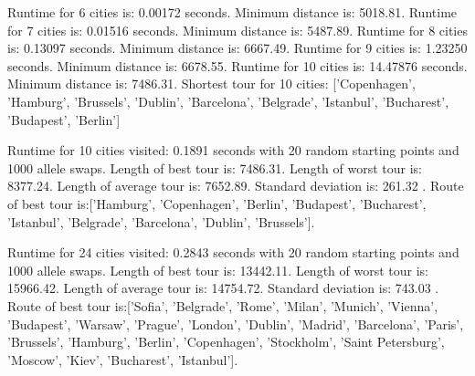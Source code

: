 Runtime for 6 cities is: 0.00172 seconds.
Minimum distance is: 5018.81.
Runtime for 7 cities is: 0.01516 seconds.
Minimum distance is: 5487.89.
Runtime for 8 cities is: 0.13097 seconds.
Minimum distance is: 6667.49.
Runtime for 9 cities is: 1.23250 seconds.
Minimum distance is: 6678.55.
Runtime for 10 cities is: 14.47876 seconds.
Minimum distance is: 7486.31.
Shortest tour for 10 cities:
['Copenhagen', 'Hamburg', 'Brussels', 'Dublin', 'Barcelona', 'Belgrade', 'Istanbul', 'Bucharest', 'Budapest', 'Berlin']


Runtime for 10 cities visited: 0.1891 seconds with 20 random starting points and 1000 allele swaps.
 Length of best tour is: 7486.31.
 Length of worst tour is: 8377.24.
 Length of average tour is: 7652.89.
 Standard deviation is: 261.32
. Route of best tour is:['Hamburg', 'Copenhagen', 'Berlin', 'Budapest', 'Bucharest', 'Istanbul', 'Belgrade', 'Barcelona', 'Dublin', 'Brussels'].

Runtime for 24 cities visited: 0.2843 seconds with 20 random starting points and 1000 allele swaps.
 Length of best tour is: 13442.11.
 Length of worst tour is: 15966.42.
 Length of average tour is: 14754.72.
 Standard deviation is: 743.03
. Route of best tour is:['Sofia', 'Belgrade', 'Rome', 'Milan', 'Munich', 'Vienna', 'Budapest', 'Warsaw', 'Prague', 'London', 'Dublin', 'Madrid', 'Barcelona', 'Paris', 'Brussels', 'Hamburg', 'Berlin', 'Copenhagen', 'Stockholm', 'Saint Petersburg', 'Moscow', 'Kiev', 'Bucharest', 'Istanbul'].
